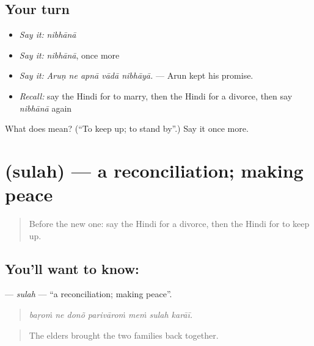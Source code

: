 \subsection*{Your turn}
\begin{itemize}
\raggedright
  \item \emph{Say it:} \emph{nibhānā}
  \item \emph{Say it:} \emph{nibhānā}, once more
  \item \emph{Say it:} \emph{Aruṇ ne apnā vādā nibhāyā.} — Arun kept his promise.
  \item \emph{Recall:} say the Hindi for to marry, then the Hindi for a divorce, then say \emph{nibhānā} again
\end{itemize}

\begin{tcolorbox}[breakable,colback=teal!4,colframe=teal!35!black,title={Before you move on}]
What does  mean? (\textquotedblleft{}To keep up; to stand by\textquotedblright{}.) Say it once more.
\end{tcolorbox}
\section[\texorpdfstring{\hi{सुलह} (sulah)}{सुलह (sulah)}]{ (sulah) — a reconciliation; making peace}

\label{lesson:HI-C501-sulah}



\begin{quote}
Before the new one: say the Hindi for a divorce, then the Hindi for to keep up.
\end{quote}

\subsection*{You'll want to know: }
\textbf{} — \emph{sulah} — \textquotedblleft{}a reconciliation; making peace\textquotedblright{}.

\begin{quote}
      
\end{quote}

\begin{quote}
\emph{baṛoṁ ne donõ parivāroṁ meṁ sulah karāī.}
\end{quote}

\begin{quote}
The elders brought the two families back together.
\end{quote}


